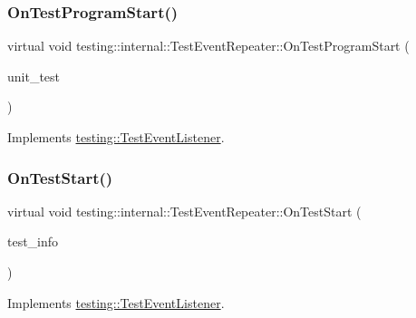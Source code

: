 \subsubsection{\texorpdfstring{OnTestProgramStart()}{OnTestProgramStart()}}
{\footnotesize\ttfamily virtual void testing\+::internal\+::\+Test\+Event\+Repeater\+::\+On\+Test\+Program\+Start (\begin{DoxyParamCaption}\item[{const \mbox{\hyperlink{classtesting_1_1UnitTest}{Unit\+Test}} \&}]{unit\+\_\+test }\end{DoxyParamCaption})\hspace{0.3cm}{\ttfamily [virtual]}}



Implements \mbox{\hyperlink{classtesting_1_1TestEventListener_a5f6c84f39851e8a603a2d2e10063816b}{testing\+::\+Test\+Event\+Listener}}.

\mbox{\label{classtesting_1_1internal_1_1TestEventRepeater_a70d694ca5010cc86cd458f7f529e6fbe}} 
\subsubsection{\texorpdfstring{OnTestStart()}{OnTestStart()}}
{\footnotesize\ttfamily virtual void testing\+::internal\+::\+Test\+Event\+Repeater\+::\+On\+Test\+Start (\begin{DoxyParamCaption}\item[{const \mbox{\hyperlink{classtesting_1_1TestInfo}{Test\+Info}} \&}]{test\+\_\+info }\end{DoxyParamCaption})\hspace{0.3cm}{\ttfamily [virtual]}}



Implements \mbox{\hyperlink{classtesting_1_1TestEventListener_ab4f6a0ca16ae75daf385b3b5914e1048}{testing\+::\+Test\+Event\+Listener}}.

\mbox{\label{classtesting_1_1internal_1_1TestEventRepeater_ac77a3d127e4726e11694e4ee9cf3b793}} 
